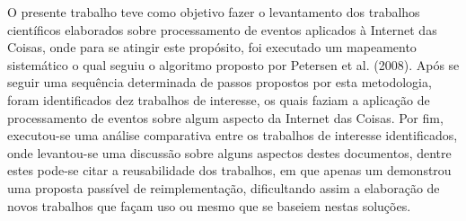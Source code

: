 \documentclass[ti,table]{texufpel} %
\begin{document}
\label{cap:Consideracoes_Finais} 

  

O presente trabalho teve como objetivo fazer o levantamento dos trabalhos científicos elaborados sobre processamento de eventos aplicados à Internet das Coisas, onde para se atingir este propósito, foi executado um mapeamento sistemático o qual seguiu o algoritmo proposto por Petersen et al. (2008). Após se seguir uma sequência determinada de passos propostos por esta metodologia, foram identificados dez trabalhos de interesse, os quais faziam a aplicação de processamento de eventos sobre algum aspecto da Internet das Coisas. Por fim, executou-se uma análise comparativa entre os trabalhos de interesse identificados, onde levantou-se uma discussão sobre alguns aspectos destes documentos, dentre estes pode-se citar a reusabilidade dos trabalhos, em que apenas um demonstrou uma proposta passível de reimplementação, dificultando assim a elaboração de novos trabalhos que façam uso ou mesmo que se baseiem nestas soluções. 

  


  


  


 

 

  
\end{document}
